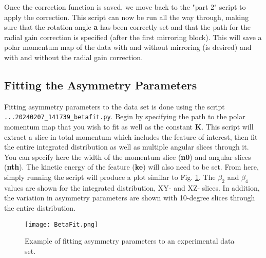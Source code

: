 \documentclass[12pt]{article}
\begin{document}
Once the correction function is saved, we move back to the "part 2" script to apply the correction.
This script can now be run all the way through, making sure that the rotation angle \textbf{a} has been correctly set and that the path for the radial gain correction is specified (after the first mirroring block).
This will save a polar momentum map of the data with and without mirroring (is desired) and with and without the radial gain correction.

\subsection{Fitting the Asymmetry Parameters}

Fitting asymmetry parameters to the data set is done using the script \texttt{...20240207\_141739\_betafit.py}.
Begin by specifying the path to the polar momentum map that you wish to fit as well as the constant \textbf{K}.
This script will extract a slice in total momentum which includes the feature of interest, then fit the entire integrated distribution as well as multiple angular slices through it.
You can specify here the width of the momentum slice (\textbf{n0}) and angular slices (\textbf{nth}).
The kinetic energy of the feature (\textbf{ke}) will also need to be set.
From here, simply running the script will produce a plot similar to Fig. \ref{fig:BetaFit}.
The $\beta_2$ and $\beta_4$ values are shown for the integrated distribution, XY- and XZ- slices.
In addition, the variation in asymmetry parameters are shown with 10-degree slices through the entire distribution.

\begin{figure}
\centering
\texttt{[image: BetaFit.png]}
\caption{
Example of fitting asymmetry parameters to an experimental data set.
}\label{fig:BetaFit}
\end{figure}
\end{document}
